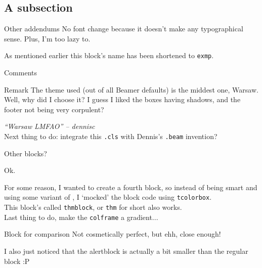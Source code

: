 \documentclass{tropical}
\begin{document}
\subsection{A subsection}
\begin{frame}{Other addendums}
No font change because it doesn't make any typographical sense. Plus, I'm too lazy to.
\begin{exmp}[Exampleblock]
As mentioned earlier this block's name has been shortened to \texttt{exmp}.
\end{exmp}
\end{frame}
\begin{frame}{Comments}
\begin{block}{Remark}
The theme used (out of all Beamer defaults) is the middest one, Warsaw.
\\
Well, why did I choose it? I guess I liked the boxes having shadows, and the footer not being very corpulent?
\end{block}
{\itshape ``Warsaw LMFAO'' -- dennisc}
\\[4pt]
Next thing to do: integrate this \texttt{.cls} with Dennis's \texttt{.beam} invention?
\end{frame}
\begin{frame}{Other blocks?}
\begin{warn}
Ok.
\end{warn}
\begin{thm}[Thmblock by me]
For some reason, I wanted to create a fourth block, so instead of being smart and using some variant of , I `mocked' the block code using \texttt{tcolorbox}.\\
This block's called \texttt{thmblock}, or \texttt{thm} for short also works.\\
Last thing to do, make the \texttt{colframe} a gradient...
\end{thm}
\begin{block}{Block for comparison}
Not cosmetically perfect, but ehh, close enough!
\end{block}
I also just noticed that the alertblock is actually a bit smaller than the regular block :P
\end{frame}
\end{document}

